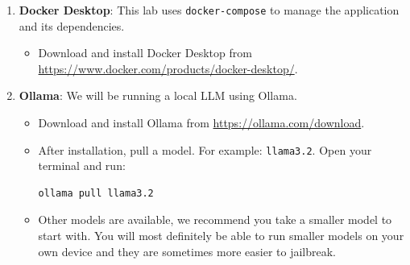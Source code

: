\documentclass{article}
\begin{document}
\begin{enumerate}[label=\arabic*.]
    \item \textbf{Docker Desktop}: This lab uses \texttt{docker-compose} to manage the application and its dependencies.
    \begin{itemize}
        \item Download and install Docker Desktop from \url{https://www.docker.com/products/docker-desktop/}.
    \end{itemize}
    \item \textbf{Ollama}: We will be running a local LLM using Ollama.
    \begin{itemize}
        \item Download and install Ollama from \url{https://ollama.com/download}.
        \item After installation, pull a model. For example: \texttt{llama3.2}. Open your terminal and run:
\begin{Verbatim}[commandchars=\\\{\}]
ollama pull llama3.2
\end{Verbatim}
        \item Other models are available, we recommend you take a smaller model to start with. You will most definitely be able to run smaller models on your own device and they are sometimes more easier to jailbreak.
    \end{itemize}
\end{enumerate}
\end{document}
